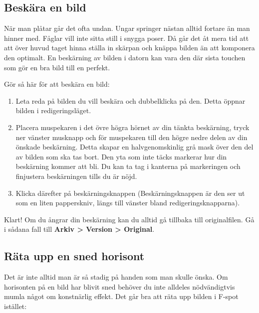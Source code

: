 \documentclass[a4paper,final]{memoir} %
\begin{document}

\subsection{Beskära en bild}


När man plåtar går det ofta undan. Ungar springer nästan alltid fortare än man hinner med. Fåglar vill inte sitta still i snygga poser. Då går det åt mera tid att att över huvud taget hinna ställa in skärpan och knäppa bilden än att komponera den optimalt. En beskärning av bilden i datorn kan vara den där sista touchen som gör en bra bild till en perfekt. 

Gör så här för att beskära en bild:

\begin{enumerate}

\item Leta reda på bilden du vill beskära och dubbelklicka på den. Detta öppnar bilden i redigeringsläget.

\item Placera muspekaren i det övre högra hörnet av din tänkta beskärning, tryck ner vänster musknapp och för muspekaren till den högre nedre delen av din önskade beskärning. Detta skapar en halvgenomskinlig grå mask över den del av bilden som ska tas bort. Den yta som inte täcks markerar hur din beskärning kommer att bli. Du kan ta tag i kanterna på markeringen och finjustera beskärningen tills du är nöjd.

\item Klicka därefter på beskärningsknappen (Beskärningsknappen är den ser ut som en liten papperskniv, längs till vänster bland redigeringsknapparna).

\end{enumerate}

Klart! Om du ångrar din beskärning kan du alltid gå tillbaka till originalfilen. Gå i sådana fall till \textbf{Arkiv \textgreater{} Version \textgreater{} Original}.


\subsection{Räta upp en sned horisont}


Det är inte alltid man är så stadig på handen som man skulle önska. Om horisonten på en bild har blivit sned behöver du inte alldeles nödvändigtvis mumla något om konstnärlig effekt. Det går bra att räta upp bilden i F-spot istället:
\end{document}
